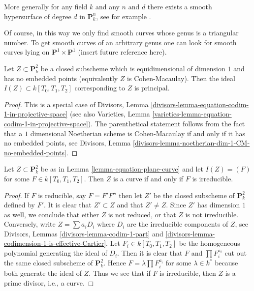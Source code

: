 \medskip\noindent
More generally for any field $k$ and any $n$ and $d$ there exists
a smooth hypersurface of degree $d$ in $\mathbf{P}^n_k$, see
for example \cite{Poonen}.

\medskip\noindent
Of course, in this way we only find smooth curves whose genus
is a triangular number. To get smooth curves of an arbitrary
genus one can look for smooth curves lying on
$\mathbf{P}^1 \times \mathbf{P}^1$ (insert future reference here).

\begin{lemma}
\label{lemma-equation-plane-curve}
Let $Z \subset \mathbf{P}^2_k$ be a closed subscheme which
is equidimensional of dimension $1$ and has no embedded points
(equivalently $Z$ is Cohen-Macaulay).
Then the ideal $I(Z) \subset k[T_0, T_1, T_2]$ corresponding
to $Z$ is principal.
\end{lemma}

\begin{proof}
This is a special case of
Divisors, Lemma \ref{divisors-lemma-equation-codim-1-in-projective-space}
(see also Varieties, Lemma
\ref{varieties-lemma-equation-codim-1-in-projective-space}).
The parenthetical statement follows from the fact that a
$1$ dimensional Noetherian scheme is Cohen-Macaulay
if and only if it has no embedded points, see
Divisors, Lemma \ref{divisors-lemma-noetherian-dim-1-CM-no-embedded-points}.
\end{proof}

\begin{lemma}
\label{lemma-plane-curve}
Let $Z \subset \mathbf{P}^2_k$ be as in Lemma \ref{lemma-equation-plane-curve}
and let $I(Z) = (F)$ for some $F \in k[T_0, T_1, T_2]$.
Then $Z$ is a curve if and only if $F$ is irreducible.
\end{lemma}

\begin{proof}
If $F$ is reducible, say $F = F' F''$ then let $Z'$ be the closed subscheme
of $\mathbf{P}^2_k$ defined by $F'$. It is clear that $Z' \subset Z$
and that $Z' \not = Z$. Since $Z'$ has dimension $1$ as well, we conclude
that either $Z$ is not reduced, or that $Z$ is not irreducible.
Conversely, write $Z = \sum a_i D_i$ where $D_i$ are the irreducible
components of $Z$, see
Divisors, Lemmas \ref{divisors-lemma-codim-1-part} and
\ref{divisors-lemma-codimension-1-is-effective-Cartier}.
Let $F_i \in k[T_0, T_1, T_2]$ be the homogeneous
polynomial generating the ideal of $D_i$. Then it is clear that
$F$ and $\prod F_i^{a_i}$ cut out the same closed subscheme of
$\mathbf{P}^2_k$. Hence $F = \lambda \prod F_i^{a_i}$ for some
$\lambda \in k^*$ because both generate the ideal of $Z$.
Thus we see that if $F$ is irreducible, then $Z$ is
a prime divisor, i.e., a curve.
\end{proof}

